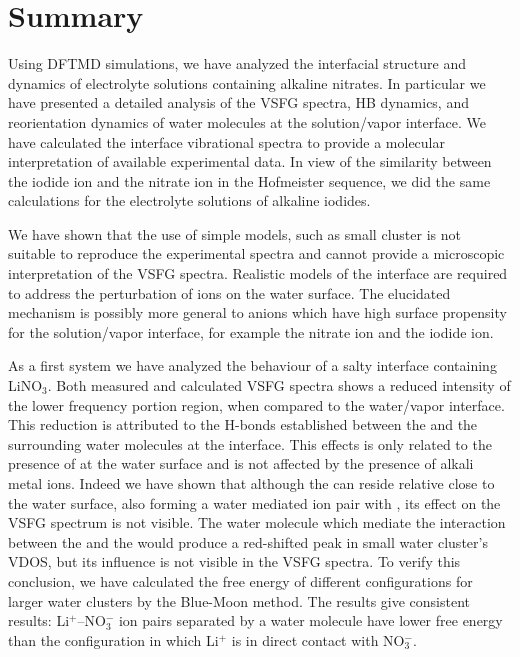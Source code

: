 \chapter{Summary}\label{CHAPTER_Summary}
Using DFTMD simulations, we have analyzed the interfacial structure and dynamics of electrolyte solutions containing alkaline nitrates.
In particular we have presented a detailed analysis of the VSFG spectra, HB dynamics, and reorientation dynamics of water molecules at the solution/vapor interface. 
We have calculated the interface vibrational spectra to provide a molecular interpretation of available experimental data. 
In view of the similarity between the iodide ion and the nitrate ion in the Hofmeister sequence, 
we did the same calculations for the electrolyte solutions of alkaline iodides. 

We have shown that the use of simple models, such as small cluster is not suitable to reproduce the experimental spectra 
and cannot provide a microscopic interpretation of the VSFG spectra. Realistic models of the interface are required to address the 
perturbation of ions on the water surface. The elucidated mechanism is possibly more general to anions which have high 
surface propensity for the solution/vapor interface, for example the nitrate ion and the iodide ion.

As a first system we have analyzed the behaviour of a salty interface containing LiNO$_3$.
Both measured and calculated VSFG spectra shows a reduced intensity of the lower frequency portion region, 
when compared to the water/vapor interface. 
This reduction is attributed to the H-bonds established between the \nitrate and the surrounding water molecules at the interface.
This effects is only related to the presence of \nitrate at the water surface and is not affected by the presence of alkali metal ions.
Indeed we have shown that although the \Li can reside relative close to the water surface, also forming a water mediated
ion pair with \nit, its effect on the VSFG spectrum is not visible. The water molecule which mediate the interaction 
between the \nitrate and the \Li would produce a red-shifted peak in small water cluster's VDOS, but its influence is not visible 
in the VSFG spectra. To verify this conclusion, we have calculated the free energy of different configurations for 
larger water clusters by the Blue-Moon method. The results give consistent results: Li$^+$--NO$_3^-$ ion pairs 
separated by a water molecule have lower free energy than the configuration in which Li$^+$ is in direct contact with NO$_3^-$. 

